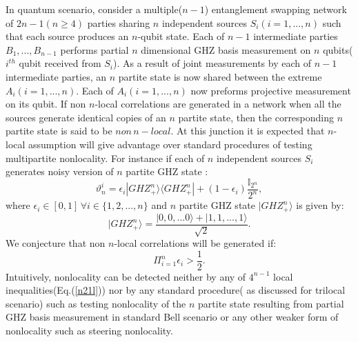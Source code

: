 \documentclass[pra,10pt,twocolumn,superscriptaddress,floatfix,showpacs]{revtex4-1}
\begin{document}
In quantum scenario, consider a multiple($n-1$) entanglement swapping  network of $2n-1(n\geq4)$ parties sharing $n$ independent sources $S_i(i=1,...,n)$ such that each source produces an $n$-qubit state. Each of $n-1$ intermediate parties $B_1,...,B_{n-1}$ performs partial $n$ dimensional GHZ basis measurement on $n$ qubits($i^{th}$ qubit received from $S_i$). As a result of joint measurements by each of $n-1$ intermediate parties, an $n$ partite state is now shared between the extreme $A_i(i=1,...,n)$. Each of $A_i(i=1,...,n)$ now preforms projective measurement on its qubit. If non $n$-local correlations are generated in a network when all the sources generate identical copies of an $n$ partite state, then the corresponding $n$ partite state is said to be $non\,n-local$. At this junction it is expected that $n$-local assumption will give advantage over standard procedures of testing multipartite nonlocality. For instance if each of $n$ independent sources $S_i$ generates noisy version of $n$ partite GHZ state :
\begin{equation}\label{n20}
\vartheta_n^i=\epsilon_i |GHZ_+^n\rangle\langle GHZ_+^n|+(1-\epsilon_i) \frac{\mathbb{I}_{2^n}}{2^n},
\end{equation}
\textmd{where} $\epsilon_i\in[0,1]\,\forall i\in\{1,2,...,n\}$ and $n$ partite GHZ state $|GHZ_+^n\rangle$ is given by:
\begin{equation}\label{ghzn}
    |GHZ_+^n\rangle=\frac{|0,0,...0\rangle+|1,1,...,1\rangle}{\sqrt{2}}.
\end{equation}
We conjecture that non $n$-local correlations will be generated if:
\begin{equation}\label{con}
    \Pi_{i=1}^n \epsilon_i>\frac{1}{2}.
\end{equation}
Intuitively, nonlocality can be detected neither by any of $4^{n-1}$ local inequalities(Eq.(\ref{n21l})) nor by any standard procedure( as discussed for trilocal scenario) such as  testing nonlocality of the $n$ partite state resulting from partial GHZ basis measurement in standard Bell scenario or any other weaker form of nonlocality such as steering nonlocality.
\end{document}
